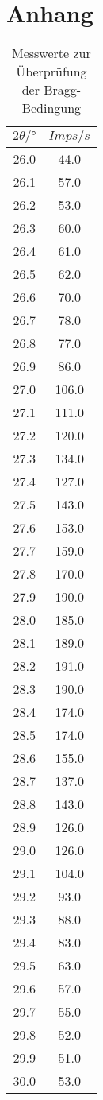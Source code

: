 \section{Anhang}

\begin{table}[H]
    \centering
    \caption{Messwerte zur Überprüfung der Bragg-Bedingung}
    \label{tab:1}
    \begin{tabular}{c c}
        \toprule
        $2 \theta /° $ & $Imps/s$ \\
        \midrule
        26.0  & 44.0 \\
        26.1  &	57.0 \\
        26.2  &	53.0 \\
        26.3  &	60.0 \\
        26.4  &	61.0 \\
        26.5  &	62.0 \\
        26.6  &	70.0 \\
        26.7  &	78.0 \\
        26.8  &	77.0 \\
        26.9  &	86.0 \\
        27.0  &	106.0 \\
        27.1  &	111.0 \\
        27.2  &	120.0 \\
        27.3  &	134.0 \\
        27.4  &	127.0 \\
        27.5  &	143.0 \\
        27.6  &	153.0 \\
        27.7  &	159.0 \\
        27.8  &	170.0 \\
        27.9  &	190.0 \\
        28.0  &	185.0 \\
        28.1  &	189.0 \\
        28.2  &	191.0 \\
        28.3  &	190.0 \\
        28.4  &	174.0 \\
        28.5  &	174.0 \\
        28.6  &	155.0 \\
        28.7  &	137.0 \\
        28.8  &	143.0 \\
        28.9  &	126.0 \\
        29.0  &	126.0 \\
        29.1  &	104.0 \\
        29.2  &	93.0 \\
        29.3  &	88.0 \\
        29.4  &	83.0 \\
        29.5  &	63.0 \\
        29.6  &	57.0 \\
        29.7  &	55.0 \\
        29.8  &	52.0 \\
        29.9  &	51.0 \\
        30.0  &	53.0 \\
        \bottomrule
    \end{tabular}
\end{table}

